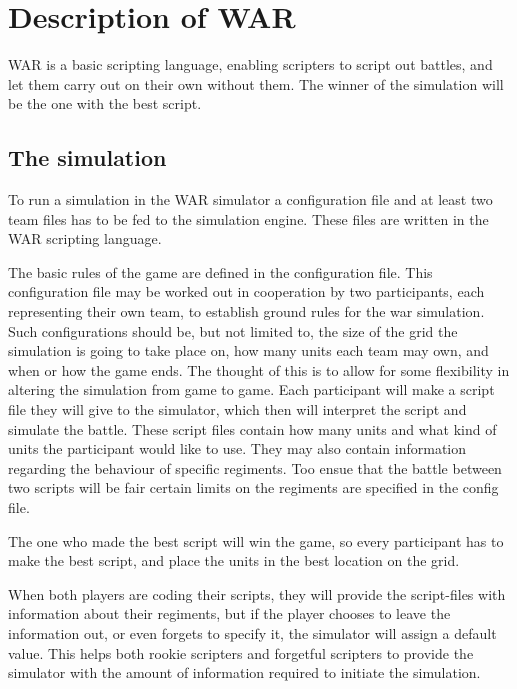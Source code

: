 
\section{ Description of WAR }
WAR is a basic scripting language, enabling scripters to script out battles, and let them carry out on their own without them. The winner of the simulation will be the one with the best script. \\
	\subsection{The simulation}
		To run a simulation in the WAR simulator a configuration file and at least two team files has to be fed to the simulation engine. 
		These files are written in the WAR scripting language.
		
		The basic rules of the game are defined in the configuration file. 
		This configuration file may be worked out in cooperation by two participants, each representing their own team, 
		to establish ground rules for the war simulation. Such configurations should be, but not limited to, 
		the size of the grid the simulation is going to take place on, how many units each team may own, and when or how the game ends.
		The thought of this is to allow for some flexibility in altering the simulation from game to game.
		Each participant will make a script file they will give to the simulator, 
		which then will interpret the script and simulate the battle. 
		These script files contain how many units and what kind of units the participant would like to use. 
		They may also contain information regarding the behaviour of specific regiments. 
		Too ensue that the battle between two scripts will be fair certain limits on the regiments are specified in the config file.
	
		The one who made the best script will win the game, so every participant has to make the best script, 
		and place the units in the best location on the grid.
	
		When both players are coding their scripts, they will provide the script-files with information about their regiments, 
		but if the player chooses to leave the information out, or even forgets to specify it, 
		the simulator will assign a default value. 
		This helps both rookie scripters and forgetful scripters to provide the simulator 
		with the amount of information required to initiate the simulation.

